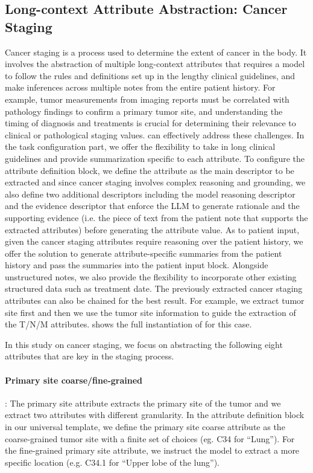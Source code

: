 \subsection{Long-context Attribute Abstraction: Cancer Staging}

Cancer staging is a process used to determine the extent of cancer in the body. It involves the abstraction of multiple long-context attributes that requires a model to follow the rules and definitions set up in the lengthy clinical guidelines, and make inferences across multiple notes from the entire patient history.
For example, tumor measurements from imaging reports must be correlated with pathology findings to confirm a primary tumor site, and understanding the timing of diagnosis and treatments is crucial for determining their relevance to clinical or pathological staging values. \ours can effectively address these challenges. In the task configuration part, we offer the flexibility to take in long clinical guidelines and provide summarization specific to each attribute. To configure the attribute definition block, we define the attribute as the main descriptor to be extracted and since cancer staging involves complex reasoning and grounding, we also define two additional descriptors including the model reasoning descriptor and the evidence descriptor that enforce the \ac{LLM} to generate rationale and the supporting evidence (i.e. the piece of text from the patient note that supports the extracted attributes) before generating the attribute value. 
As to patient input, given the cancer staging attributes require reasoning over the patient history, we offer the solution to generate attribute-specific summaries from the patient history and pass the summaries into the patient input block. Alongside unstructured notes, we also provide the flexibility to incorporate other existing structured data such as treatment date. The previously extracted cancer staging attributes can also be chained for the best result. For example, we extract tumor site first and then we use the tumor site information to guide the extraction of the T/N/M attributes.  shows the full instantiation of \ours for this case.

In this study on cancer staging, we focus on abstracting the following eight attributes that are key in the staging process. 





\paragraph{Primary site coarse/fine-grained}: The primary site attribute extracts the primary site of the tumor and we extract two attributes with different granularity. In the attribute definition block in our universal template, we define the primary site coarse attribute as the coarse-grained tumor site with a finite set of choices (eg. C34 for ``Lung''). For the fine-grained primary site attribute, we instruct the model to extract a more specific location (e.g. C34.1 for ``Upper lobe of the lung''). 

